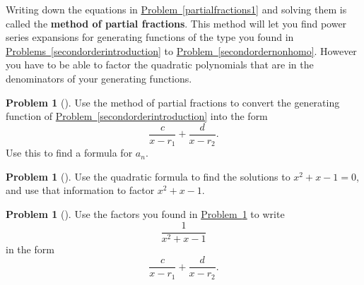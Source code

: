 \documentclass[10pt,]{book}
\newcommand{\terminology}[1]{\textbf{#1}}
\theoremstyle{plain}
\theoremstyle{definition}
\newtheorem{activity}[project]{Problem}
\theoremstyle{definition}
\numberwithin{equation}{chapter}
\begin{document}
Writing down the equations in \hyperref[partialfractions1]{Problem~\ref{partialfractions1}} and solving them is called the \terminology{method of partial fractions}. This method will let you find power series expansions for generating functions of the type you found in \hyperref[secondorderintroduction]{Problems~\ref{secondorderintroduction}} to \hyperref[secondordernonhomo]{Problem~\ref{secondordernonhomo}}. However you have to be able to factor the quadratic polynomials that are in the denominators of your generating functions.%
\begin{activity}[] \label{activity-219}
Use the method of partial fractions to convert the generating function of \hyperref[secondorderintroduction]{Problem~\ref{secondorderintroduction}} into the form%
\begin{equation*}
\frac{c}{x-r_1} + \frac{d}{x-r_2}\text{.}
\end{equation*}
Use this to find a formula for \(a_n\).%
\end{activity}
\begin{activity}[] \label{factorFibonacci}
Use the quadratic formula to find the solutions to \(x^2+x-1=0\), and use that information to factor \(x^2+x-1\).%
\end{activity}
\begin{activity}[] \label{fractionFibonacci}
Use the factors you found in \hyperref[factorFibonacci]{Problem~\ref{factorFibonacci}} to write%
\begin{equation*}
\frac{1}{x^2+x-1}
\end{equation*}
in the form%
\begin{equation*}
\frac{c}{x-r_1} + \frac{d}{x-r_2}.
\end{equation*}
%
\end{activity}
\end{document}
